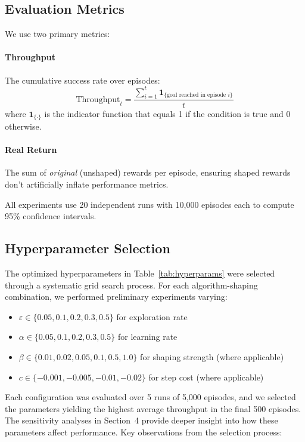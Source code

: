 \documentclass[11pt,a4paper]{article}
\begin{document}
\subsection{Evaluation Metrics}

We use two primary metrics:

\paragraph{Throughput} 
The cumulative success rate over episodes:
\begin{equation}
\text{Throughput}_t = \frac{\sum_{i=1}^{t} \mathbf{1}_{\{\text{goal reached in episode } i\}}}{t}
\end{equation}
where $\mathbf{1}_{\{\cdot\}}$ is the indicator function that equals 1 if the condition is true and 0 otherwise.

\paragraph{Real Return}
The sum of \emph{original} (unshaped) rewards per episode, ensuring shaped rewards don't artificially inflate performance metrics.

All experiments use 20 independent runs with 10,000 episodes each to compute 95\% confidence intervals.

\subsection{Hyperparameter Selection}
\label{subsec:hyperparameter_selection}

The optimized hyperparameters in Table~\ref{tab:hyperparams} were selected through a systematic grid search process. For each algorithm-shaping combination, we performed preliminary experiments varying:
\begin{itemize}
    \item $\varepsilon \in \{0.05, 0.1, 0.2, 0.3, 0.5\}$ for exploration rate
    \item $\alpha \in \{0.05, 0.1, 0.2, 0.3, 0.5\}$ for learning rate
    \item $\beta \in \{0.01, 0.02, 0.05, 0.1, 0.5, 1.0\}$ for shaping strength (where applicable)
    \item $c \in \{-0.001, -0.005, -0.01, -0.02\}$ for step cost (where applicable)
\end{itemize}

Each configuration was evaluated over 5 runs of 5,000 episodes, and we selected the parameters yielding the highest average throughput in the final 500 episodes. The sensitivity analyses in Section~4 provide deeper insight into how these parameters affect performance. Key observations from the selection process:
\end{document}
